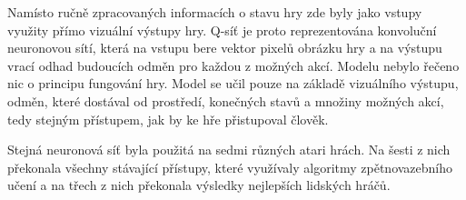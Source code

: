 Namísto ručně zpracovaných informacích o stavu hry zde byly jako vstupy využity přímo vizuální výstupy hry.
Q-síť je proto reprezentována konvoluční neuronovou sítí, která na vstupu bere vektor pixelů obrázku hry a na výstupu vrací odhad budoucích odměn pro každou z možných akcí.
Modelu nebylo řečeno nic o principu fungování hry. Model se učil pouze na základě vizuálního výstupu, odměn, které dostával od prostředí, konečných stavů a množiny možných akcí, tedy stejným přístupem, jak by ke hře přistupoval člověk.

Stejná neuronová síť byla použitá na sedmi různých atari hrách. Na šesti z nich překonala všechny stávající přístupy, které využívaly algoritmy zpětnovazebního učení a na třech z nich překonala výsledky nejlepších lidských hráčů.


